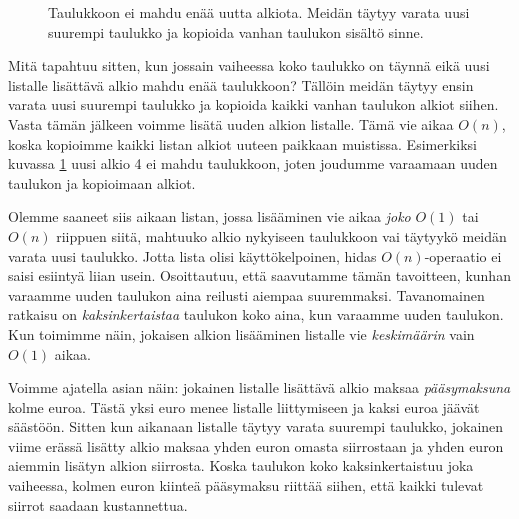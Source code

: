 \begin{figure}
\center
{}
\caption{Taulukkoon ei mahdu enää uutta alkiota. Meidän täytyy varata uusi suurempi taulukko
ja kopioida vanhan taulukon sisältö sinne.}
\label{fig:lisuus}
\end{figure}

Mitä tapahtuu sitten, kun jossain vaiheessa koko taulukko
on täynnä eikä uusi listalle lisättävä alkio mahdu enää taulukkoon?
Tällöin meidän täytyy ensin varata uusi suurempi taulukko ja
kopioida kaikki vanhan taulukon alkiot siihen.
Vasta tämän jälkeen voimme lisätä uuden alkion listalle.
Tämä vie aikaa $O(n)$, koska kopioimme kaikki listan alkiot
uuteen paikkaan muistissa.
Esimerkiksi kuvassa \ref{fig:lisuus} uusi alkio 4 ei mahdu taulukkoon,
joten joudumme varaamaan uuden taulukon ja kopioimaan alkiot.

Olemme saaneet siis aikaan listan, jossa lisääminen
vie aikaa \emph{joko} $O(1)$ tai $O(n)$ riippuen siitä,
mahtuuko alkio nykyiseen taulukkoon vai täytyykö
meidän varata uusi taulukko.
Jotta lista olisi käyttökelpoinen, hidas $O(n)$-operaatio
ei saisi esiintyä liian usein.
Osoittautuu, että saavutamme tämän tavoitteen,
kunhan varaamme uuden taulukon aina reilusti aiempaa suuremmaksi.
Tavanomainen ratkaisu on \emph{kaksinkertaistaa} taulukon koko aina,
kun varaamme uuden taulukon.
Kun toimimme näin, jokaisen alkion lisääminen listalle vie
\emph{keskimäärin} vain $O(1)$ aikaa.

Voimme ajatella asian näin: jokainen listalle lisättävä alkio
maksaa \emph{pääsy\-maksuna} kolme euroa.
Tästä yksi euro menee listalle liittymiseen ja kaksi euroa jäävät säästöön.
Sitten kun aikanaan listalle täytyy varata suurempi taulukko,
jokainen viime erässä lisätty alkio maksaa yhden euron omasta siirrostaan
ja yhden euron aiemmin lisätyn alkion siirrosta.
Koska taulukon koko kaksinkertaistuu joka vaiheessa,
kolmen euron kiinteä pääsymaksu riittää siihen, että kaikki tulevat
siirrot saadaan kustannettua.

